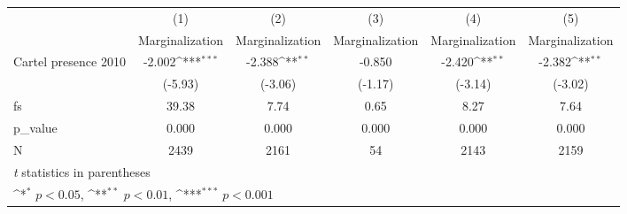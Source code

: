 {
\def\sym#1{\ifmmode^{#1}\else\(^{#1}\)\fi}
\begin{tabular}{l*{5}{c}}
\hline\hline
                    &\multicolumn{1}{c}{(1)}&\multicolumn{1}{c}{(2)}&\multicolumn{1}{c}{(3)}&\multicolumn{1}{c}{(4)}&\multicolumn{1}{c}{(5)}\\
                    &\multicolumn{1}{c}{Marginalization}&\multicolumn{1}{c}{Marginalization}&\multicolumn{1}{c}{Marginalization}&\multicolumn{1}{c}{Marginalization}&\multicolumn{1}{c}{Marginalization}\\
\hline
Cartel presence 2010&      -2.002\sym{***}&      -2.388\sym{**} &      -0.850         &      -2.420\sym{**} &      -2.382\sym{**} \\
                    &     (-5.93)         &     (-3.06)         &     (-1.17)         &     (-3.14)         &     (-3.02)         \\
\hline
fs                  &       39.38         &        7.74         &        0.65         &        8.27         &        7.64         \\
p\_value             &       0.000         &       0.000         &       0.000         &       0.000         &       0.000         \\
N                   &        2439         &        2161         &          54         &        2143         &        2159         \\
\hline\hline
\multicolumn{6}{l}{\footnotesize \textit{t} statistics in parentheses}\\
\multicolumn{6}{l}{\footnotesize \sym{*} \(p<0.05\), \sym{**} \(p<0.01\), \sym{***} \(p<0.001\)}\\
\end{tabular}
}
